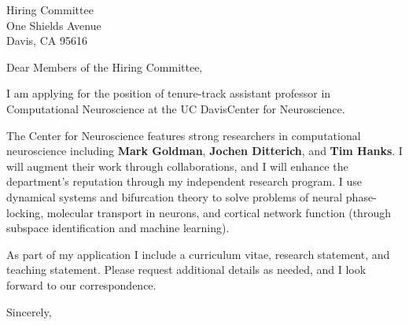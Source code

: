 \documentclass[11pt,a4paper]{letter}
\begin{document}
\def\School{UC Davis}
\begin{letter}
{Hiring Committee\\
One Shields Avenue\\
Davis, CA 95616}


\opening{Dear Members of the Hiring Committee,}

I am applying for the position of tenure-track assistant professor in Computational Neuroscience at the \School Center for Neuroscience. 



The Center for Neuroscience features strong researchers in computational neuroscience including \textbf{Mark Goldman}, \textbf{Jochen Ditterich}, and \textbf{Tim Hanks}. I will augment their work through collaborations, and I will enhance the department's reputation through my independent research program. I use dynamical systems and bifurcation theory to solve problems of neural phase-locking, molecular transport in neurons, and cortical network function (through subspace identification and machine learning).



As part of my application I include a curriculum vitae, research statement, and teaching statement. Please request additional details as needed, and I look forward to our correspondence.

\closing{Sincerely,}
\end{letter}
\end{document}
